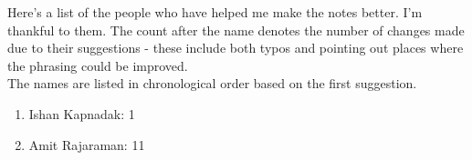 Here's a list of the people who have helped me make the notes better. I'm thankful to them. The count after the name denotes the number of changes made due to their suggestions - these include both typos and pointing out places where the phrasing could be improved.\\
The names are listed in chronological order based on the first suggestion.\\

\begin{enumerate}[nosep]
	\item Ishan Kapnadak: 1
	\item Amit Rajaraman: 11
\end{enumerate}